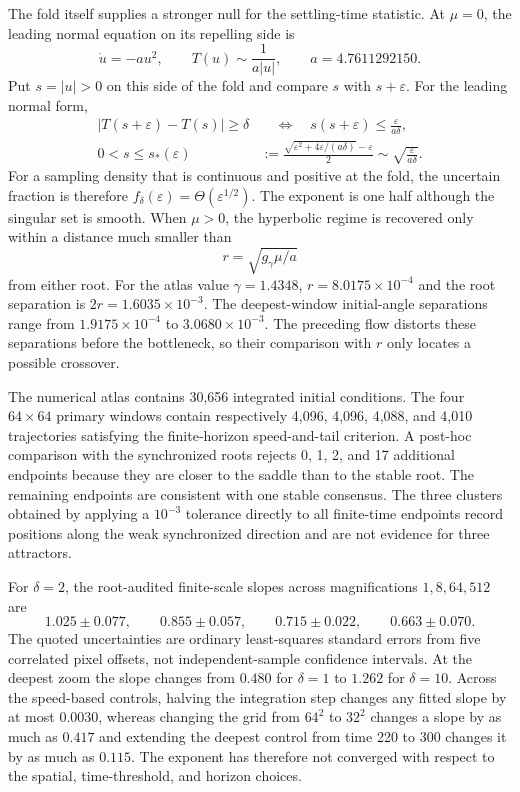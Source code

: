 \documentclass[11pt,a4paper]{article}
\theoremstyle{definition}
\begin{document}
The fold itself supplies a stronger null for the settling-time statistic.  At
$\mu=0$, the leading normal equation on its repelling side is
\begin{equation}
 \dot u=-a u^2,\qquad
 T(u)\sim\frac{1}{a|u|},\qquad a=4.7611292150.
 \label{eq:fold-settling-null}
\end{equation}
Put $s=|u|>0$ on this side of the fold and compare $s$ with $s+\varepsilon$.  For the
leading normal form,
\begin{align*}
 |T(s+\varepsilon)-T(s)|\geq\delta
 &\quad\Longleftrightarrow\quad
 s(s+\varepsilon)\leq\frac{\varepsilon}{a\delta},\\
 0<s\leq s_*(\varepsilon)
 &:=\frac{\sqrt{\varepsilon^2+4\varepsilon/(a\delta)}-\varepsilon}{2}
 \sim\sqrt{\frac{\varepsilon}{a\delta}}.
\end{align*}
For a sampling density that is continuous and positive at the fold, the uncertain
fraction is therefore $f_\delta(\varepsilon)=\Theta(\varepsilon^{1/2})$.  The exponent
is one half although the singular set is smooth.  When
$\mu>0$, the hyperbolic regime is recovered only within a distance much smaller than
\[
 r=\sqrt{g_\gamma\mu/a}
\]
from either root.  For the atlas value $\gamma=1.4348$,
$r=8.0175\times10^{-4}$ and the root separation is
$2r=1.6035\times10^{-3}$.  The deepest-window initial-angle separations range from
$1.9175\times10^{-4}$ to $3.0680\times10^{-3}$.  The preceding flow distorts these
separations before the bottleneck, so their comparison with $r$ only locates a
possible crossover.

The numerical atlas contains 30,656 integrated initial conditions.  The four
$64\times64$ primary windows contain respectively 4,096, 4,096, 4,088, and 4,010
  trajectories satisfying the finite-horizon speed-and-tail criterion.  A post-hoc comparison
with the synchronized roots rejects 0, 1, 2, and 17 additional endpoints because
they are closer to the saddle than to the stable root.  The remaining endpoints are
  consistent with one stable consensus.  The three clusters obtained by applying a
  $10^{-3}$ tolerance directly to all finite-time endpoints record positions along the
  weak synchronized direction and are not evidence for three attractors.

For $\delta=2$, the root-audited finite-scale slopes across magnifications
$1,8,64,512$ are
\[
 1.025\pm0.077,\qquad 0.855\pm0.057,\qquad
 0.715\pm0.022,\qquad 0.663\pm0.070.
\]
The quoted uncertainties are ordinary least-squares standard errors from five
correlated pixel offsets, not independent-sample confidence intervals.  At the
deepest zoom the slope changes from $0.480$ for $\delta=1$ to $1.262$ for
$\delta=10$.  Across the speed-based controls, halving the integration step changes
any fitted slope by at most $0.0030$, whereas changing the grid from $64^2$ to
$32^2$ changes a slope by as much as $0.417$ and extending the deepest control from
time 220 to 300 changes it by as much as $0.115$.  The exponent has therefore not converged with respect to the
spatial, time-threshold, and horizon choices.
\end{document}
